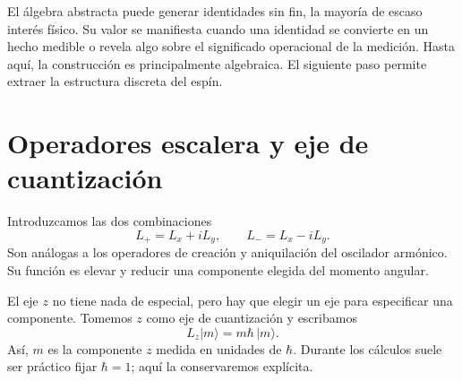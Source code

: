 \begin{classroomqa}
\end{classroomqa}

El álgebra abstracta puede generar identidades sin fin, la mayoría de escaso interés físico. Su valor se manifiesta cuando una identidad se convierte en un hecho medible o revela algo sobre el significado operacional de la medición. Hasta aquí, la construcción es principalmente algebraica. El siguiente paso permite extraer la estructura discreta del espín.

\begin{classroomqa}
\end{classroomqa}

\section{Operadores escalera y eje de cuantización}

Introduzcamos las dos combinaciones
\begin{equation}
L_+=L_x+iL_y,
\qquad
L_-=L_x-iL_y.
\end{equation}
Son análogas a los operadores de creación y aniquilación del oscilador armónico. Su función es elevar y reducir una componente elegida del momento angular.

El eje \(z\) no tiene nada de especial, pero hay que elegir un eje para especificar una componente. Tomemos \(z\) como eje de cuantización y escribamos
\begin{equation}
L_z\lvert m\rangle=m\hbar\,\lvert m\rangle.
\end{equation}
Así, \(m\) es la componente \(z\) medida en unidades de \(\hbar\). Durante los cálculos suele ser práctico fijar \(\hbar=1\); aquí la conservaremos explícita.

